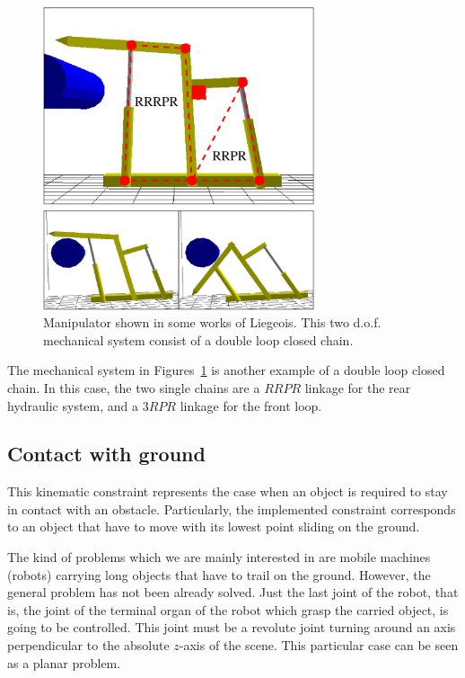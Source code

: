 \begin{figure}[ht!]
\begin{center}
  \includegraphics[width=8.0cm]{FIG/Constraint/liegeois.eps}
\end{center}
\caption{\label{fig:liegeois} Manipulator shown in some works of Liegeois.
This two d.o.f. mechanical system consist of a double loop closed chain.} 
\end{figure}

The mechanical system in Figures~\ref{fig:liegeois} is another example
of a double loop closed chain. In this case, the two single chains are 
a $RRPR$ linkage for the rear hydraulic system, and a $3RPR$ linkage
for the front loop.


\subsection*{Contact with ground}

This kinematic constraint represents the case when an object is
required to stay in contact with an obstacle. Particularly, the
implemented constraint corresponds to an object that have to move with
its lowest point sliding on the ground.

The kind of problems which we are mainly interested in are mobile
machines (robots) carrying long objects that have to trail on the
ground. However, the general problem has not been already solved. Just
the last joint of the robot, that is, the joint of the terminal organ
of the robot which grasp the carried object, is going to be
controlled.  This joint must be a revolute joint turning around an
axis perpendicular to the absolute $z$-axis of the scene. This
particular case can be seen as a planar problem.

